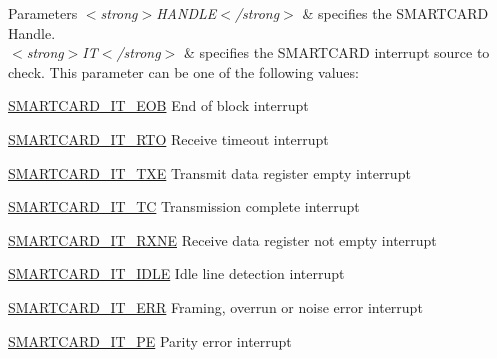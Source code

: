 \begin{DoxyParams}{Parameters}
{\em $<$strong$>$\+H\+A\+N\+D\+L\+E$<$/strong$>$} & specifies the S\+M\+A\+R\+T\+C\+A\+RD Handle. \\
\hline
{\em $<$strong$>$\+I\+T$<$/strong$>$} & specifies the S\+M\+A\+R\+T\+C\+A\+RD interrupt source to check. This parameter can be one of the following values\+: \begin{DoxyItemize}
\item \hyperlink{group___s_m_a_r_t_c_a_r_d___interrupt__definition_ga0f1d46faf880c6d17c9156c049206a7c}{S\+M\+A\+R\+T\+C\+A\+R\+D\+\_\+\+I\+T\+\_\+\+E\+OB} End of block interrupt \item \hyperlink{group___s_m_a_r_t_c_a_r_d___interrupt__definition_ga9834b14912101cac858fd7b5de574f02}{S\+M\+A\+R\+T\+C\+A\+R\+D\+\_\+\+I\+T\+\_\+\+R\+TO} Receive timeout interrupt \item \hyperlink{group___s_m_a_r_t_c_a_r_d___interrupt__definition_ga758561a96d28254dc3504cb5325dad1f}{S\+M\+A\+R\+T\+C\+A\+R\+D\+\_\+\+I\+T\+\_\+\+T\+XE} Transmit data register empty interrupt \item \hyperlink{group___s_m_a_r_t_c_a_r_d___interrupt__definition_ga808ee7d7c209374af004e8bf1d2ca492}{S\+M\+A\+R\+T\+C\+A\+R\+D\+\_\+\+I\+T\+\_\+\+TC} Transmission complete interrupt \item \hyperlink{group___s_m_a_r_t_c_a_r_d___interrupt__definition_ga75b6c6e283a114afa1130f6f1bc98da6}{S\+M\+A\+R\+T\+C\+A\+R\+D\+\_\+\+I\+T\+\_\+\+R\+X\+NE} Receive data register not empty interrupt \item \hyperlink{group___s_m_a_r_t_c_a_r_d___interrupt__definition_ga0b1a5f7e611a976c71168a5b9e3a1f0e}{S\+M\+A\+R\+T\+C\+A\+R\+D\+\_\+\+I\+T\+\_\+\+I\+D\+LE} Idle line detection interrupt \item \hyperlink{group___s_m_a_r_t_c_a_r_d___interrupt__definition_ga751761f820948ee230b30a244ca85725}{S\+M\+A\+R\+T\+C\+A\+R\+D\+\_\+\+I\+T\+\_\+\+E\+RR} Framing, overrun or noise error interrupt \item \hyperlink{group___s_m_a_r_t_c_a_r_d___interrupt__definition_gac56e07a71ab82a23930ad58e9a8dc806}{S\+M\+A\+R\+T\+C\+A\+R\+D\+\_\+\+I\+T\+\_\+\+PE} Parity error interrupt \end{DoxyItemize}
\\
\hline
\end{DoxyParams}

